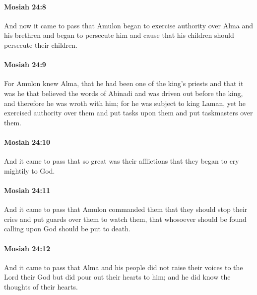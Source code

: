 		\paragraph{Mosiah 24:8} %
			\label{MOSIAH-24-8}

			And now it came to pass that
			Amulon began to exercise authority over Alma and his brethren
			and began to persecute him
			and cause that his children should persecute their children.

		\paragraph{Mosiah 24:9} %
			\label{MOSIAH-24-9}

			For Amulon knew Alma,
			that he had been one of the king's priests
			and that it was he that believed the words of Abinadi
			and was driven out before the king,
			and therefore he was wroth with him;
			for he was subject to king Laman,
			yet he exercised authority over them
			and put tasks upon them and put taskmasters over them.

		\paragraph{Mosiah 24:10} %
			\label{MOSIAH-24-10}

			And it came to pass that so great was their afflictions
			that they began to cry mightily to God.

		\paragraph{Mosiah 24:11} %
			\label{MOSIAH-24-11}

			And it came to pass that Amulon commanded them
			that they should stop their cries
			and put guards over them to watch them,
			that whosoever should be found calling upon God should be put to death.

		\paragraph{Mosiah 24:12} %
			\label{MOSIAH-24-12}

			And it came to pass that
			Alma and his people did not raise their voices to the Lord their God
			but did pour out their hearts to him;
			and he did know the thoughts of their hearts.

